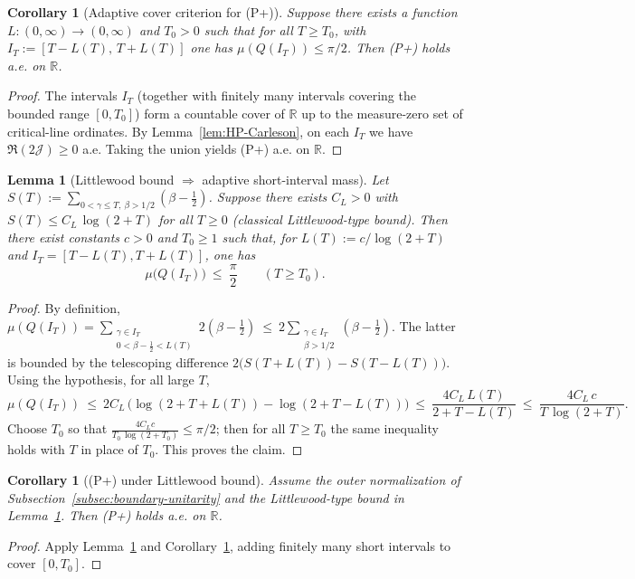 \documentclass[11pt]{article}
\newtheorem{lemma}[theorem]{Lemma}
\newtheorem{corollary}[theorem]{Corollary}
\theoremstyle{definition}
\theoremstyle{remark}
\newcommand{\R}{\mathbb{R}}
\begin{document}
\begin{corollary}[Adaptive cover criterion for (P+)]\label{cor:adaptive-cover}
Suppose there exists a function \(L:(0,\infty)\to(0,\infty)\) and \(T_0>0\) such that for all \(T\ge T_0\), with \(I_T:=[T-L(T),\,T+L(T)]\) one has \(\mu(Q(I_T))\le \pi/2\). Then \emph{(P+)} holds a.e. on \(\R\).
\end{corollary}
\begin{proof}
The intervals \(I_T\) (together with finitely many intervals covering the bounded range \([0,T_0]\)) form a countable cover of \(\R\) up to the measure-zero set of critical-line ordinates. By Lemma~\ref{lem:HP-Carleson}, on each \(I_T\) we have \(\Re(2\mathcal J)\ge 0\) a.e. Taking the union yields (P+) a.e. on \(\R\).
\end{proof}

\begin{lemma}[Littlewood bound \(\Rightarrow\) adaptive short-interval mass]\label{lem:littlewood-adaptive}
Let \(S(T):=\sum_{0<\gamma\le T,\ \beta>1/2}(\beta-\tfrac12)\). Suppose there exists \(C_L>0\) with \(S(T)\le C_L\,\log(2+T)\) for all \(T\ge 0\) (classical Littlewood-type bound). Then there exist constants \(c>0\) and \(T_0\ge 1\) such that, for \(L(T):=c/\log(2+T)\) and \(I_T=[T-L(T),T+L(T)]\), one has
\[\mu\big(Q(I_T)\big)\ \le\ \frac{\pi}{2}\qquad (T\ge T_0).\]
\end{lemma}
\begin{proof}
By definition, \(\mu(Q(I_T))=\sum_{\substack{\gamma\in I_T\\ 0<\beta-\tfrac12< L(T)}} 2(\beta-\tfrac12)\ \le\ 2\sum_{\substack{\gamma\in I_T\\ \beta>1/2}} (\beta-\tfrac12)\). The latter is bounded by the telescoping difference \(2\big(S(T+L(T)) - S(T-L(T))\big)\). Using the hypothesis, for all large \(T\),
\[
 \mu(Q(I_T))\ \le\ 2C_L\,\Big(\log(2+T+L(T)) - \log(2+T-L(T))\Big)
 \ \le\ \frac{4C_L\,L(T)}{2+T-L(T)}\ \le\ \frac{4C_L\,c}{T\,\log(2+T)}.
\]
Choose \(T_0\) so that \(\frac{4C_L c}{T_0\,\log(2+T_0)}\le \pi/2\); then for all \(T\ge T_0\) the same inequality holds with \(T\) in place of \(T_0\). This proves the claim.
\end{proof}
\begin{corollary}[(P+) under Littlewood bound]\label{cor:Pplus-Littlewood}
Assume the outer normalization of Subsection~\ref{subsec:boundary-unitarity} and the Littlewood-type bound in Lemma~\ref{lem:littlewood-adaptive}. Then \emph{(P+)} holds a.e. on \(\R\).
\end{corollary}
\begin{proof}
Apply Lemma~\ref{lem:littlewood-adaptive} and Corollary~\ref{cor:adaptive-cover}, adding finitely many short intervals to cover \([0,T_0]\).
\end{proof}
\end{document}
